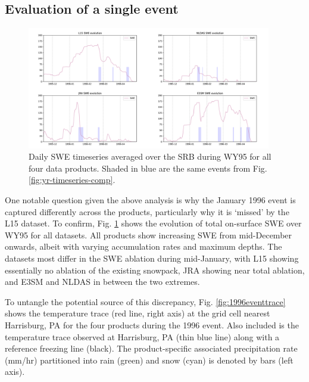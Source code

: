 \documentclass[nhess, manuscript]{copernicus}
\begin{document}
\subsection{Evaluation of a single event}

\begin{figure}
\noindent\includegraphics[width=0.95\textwidth]{figs/cropped/merged_SWE_1995.png}
\caption{Daily SWE timeseries averaged over the SRB during WY95 for all four data products. Shaded in blue are the same events from Fig. \ref{fig:yr-timeseries-comp}.}
\label{fig:allswewy95}
\end{figure}


One notable question given the above analysis is why the January 1996 event is captured differently across the products, particularly why it is `missed' by the L15 dataset. 
To confirm, Fig. \ref{fig:allswewy95} shows the evolution of total on-surface SWE over WY95 for all datasets. 
All products show increasing SWE from mid-December onwards, albeit with varying accumulation rates and maximum depths. 
The datasets most differ in the SWE ablation during mid-January, with L15 showing essentially no ablation of the existing snowpack, JRA showing near total ablation, and E3SM and NLDAS in between the two extremes.

To untangle the potential source of this discrepancy, Fig. \ref{fig:1996eventtrace} shows the temperature trace (red line, right axis) at the grid cell nearest Harrisburg, PA for the four products during the 1996 event. 
Also included is the temperature trace observed at Harrisburg, PA (thin blue line) along with a reference freezing line (black). 
The product-specific associated precipitation rate (mm/hr) partitioned into rain (green) and snow (cyan) is denoted by bars (left axis).
\end{document}
